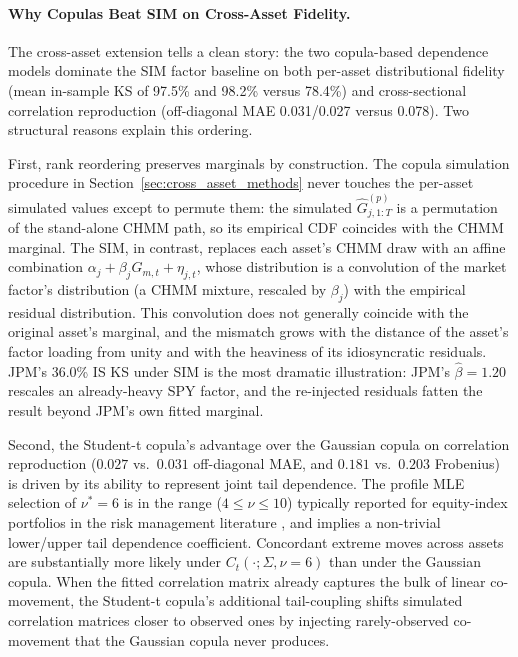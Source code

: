 \paragraph{Why Copulas Beat SIM on Cross-Asset Fidelity.}
The cross-asset extension tells a clean story: the two copula-based dependence models dominate the SIM factor baseline on both per-asset distributional fidelity (mean in-sample KS of 97.5\% and 98.2\% versus 78.4\%) and cross-sectional correlation reproduction (off-diagonal MAE 0.031/0.027 versus 0.078).
Two structural reasons explain this ordering.

First, rank reordering preserves marginals by construction.
The copula simulation procedure in Section~\ref{sec:cross_asset_methods} never touches the per-asset simulated values except to permute them: the simulated $\hat{G}_{j,1:T}^{(p)}$ is a permutation of the stand-alone CHMM path, so its empirical CDF coincides with the CHMM marginal.
The SIM, in contrast, replaces each asset's CHMM draw with an affine combination $\alpha_j + \beta_j G_{m,t} + \eta_{j,t}$, whose distribution is a convolution of the market factor's distribution (a CHMM mixture, rescaled by $\beta_j$) with the empirical residual distribution.
This convolution does not generally coincide with the original asset's marginal, and the mismatch grows with the distance of the asset's factor loading from unity and with the heaviness of its idiosyncratic residuals.
JPM's 36.0\% IS KS under SIM is the most dramatic illustration: JPM's $\hat{\beta} = 1.20$ rescales an already-heavy SPY factor, and the re-injected residuals fatten the result beyond JPM's own fitted marginal.

Second, the Student-t copula's advantage over the Gaussian copula on correlation reproduction ($0.027$ vs.\ $0.031$ off-diagonal MAE, and $0.181$ vs.\ $0.203$ Frobenius) is driven by its ability to represent joint tail dependence.
The profile MLE selection of $\nu^* = 6$ is in the range ($4 \leq \nu \leq 10$) typically reported for equity-index portfolios in the risk management literature \cite{demarta2005tcopula, mcneil2015quantitative}, and implies a non-trivial lower/upper tail dependence coefficient.
Concordant extreme moves across assets are substantially more likely under $C_t(\cdot ; \Sigma, \nu = 6)$ than under the Gaussian copula.
When the fitted correlation matrix already captures the bulk of linear co-movement, the Student-t copula's additional tail-coupling shifts simulated correlation matrices closer to observed ones by injecting rarely-observed co-movement that the Gaussian copula never produces.

